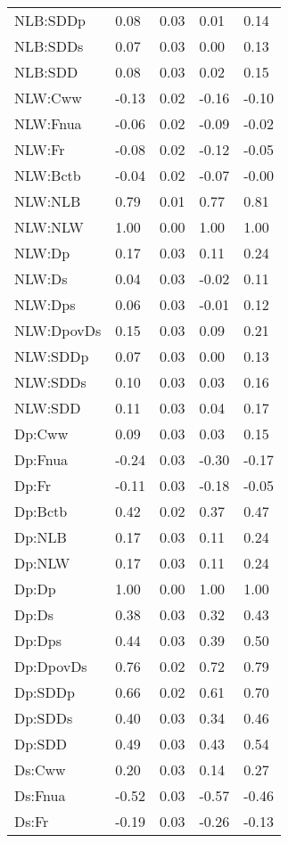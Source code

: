 \begin{center}
\begin{longtable}{|p{0.9in}|p{0.7in}|p{0.7in}|p{0.7in}|p{0.7in}|}
  NLB:SDDp & 0.08 & 0.03 & 0.01 & 0.14 \\ 
  NLB:SDDs & 0.07 & 0.03 & 0.00 & 0.13 \\ 
  NLB:SDD & 0.08 & 0.03 & 0.02 & 0.15 \\ 
  NLW:Cww & -0.13 & 0.02 & -0.16 & -0.10 \\ 
  NLW:Fnua & -0.06 & 0.02 & -0.09 & -0.02 \\ 
  NLW:Fr & -0.08 & 0.02 & -0.12 & -0.05 \\ 
  NLW:Bctb & -0.04 & 0.02 & -0.07 & -0.00 \\ 
  NLW:NLB & 0.79 & 0.01 & 0.77 & 0.81 \\ 
  NLW:NLW & 1.00 & 0.00 & 1.00 & 1.00 \\ 
  NLW:Dp & 0.17 & 0.03 & 0.11 & 0.24 \\ 
  NLW:Ds & 0.04 & 0.03 & -0.02 & 0.11 \\ 
  NLW:Dps & 0.06 & 0.03 & -0.01 & 0.12 \\ 
  NLW:DpovDs & 0.15 & 0.03 & 0.09 & 0.21 \\ 
  NLW:SDDp & 0.07 & 0.03 & 0.00 & 0.13 \\ 
  NLW:SDDs & 0.10 & 0.03 & 0.03 & 0.16 \\ 
  NLW:SDD & 0.11 & 0.03 & 0.04 & 0.17 \\ 
  Dp:Cww & 0.09 & 0.03 & 0.03 & 0.15 \\ 
  Dp:Fnua & -0.24 & 0.03 & -0.30 & -0.17 \\ 
  Dp:Fr & -0.11 & 0.03 & -0.18 & -0.05 \\ 
  Dp:Bctb & 0.42 & 0.02 & 0.37 & 0.47 \\ 
  Dp:NLB & 0.17 & 0.03 & 0.11 & 0.24 \\ 
  Dp:NLW & 0.17 & 0.03 & 0.11 & 0.24 \\ 
  Dp:Dp & 1.00 & 0.00 & 1.00 & 1.00 \\ 
  Dp:Ds & 0.38 & 0.03 & 0.32 & 0.43 \\ 
  Dp:Dps & 0.44 & 0.03 & 0.39 & 0.50 \\ 
  Dp:DpovDs & 0.76 & 0.02 & 0.72 & 0.79 \\ 
  Dp:SDDp & 0.66 & 0.02 & 0.61 & 0.70 \\ 
  Dp:SDDs & 0.40 & 0.03 & 0.34 & 0.46 \\ 
  Dp:SDD & 0.49 & 0.03 & 0.43 & 0.54 \\ 
  Ds:Cww & 0.20 & 0.03 & 0.14 & 0.27 \\ 
  Ds:Fnua & -0.52 & 0.03 & -0.57 & -0.46 \\ 
  Ds:Fr & -0.19 & 0.03 & -0.26 & -0.13 \\ 

\end{longtable}
\end{center}
